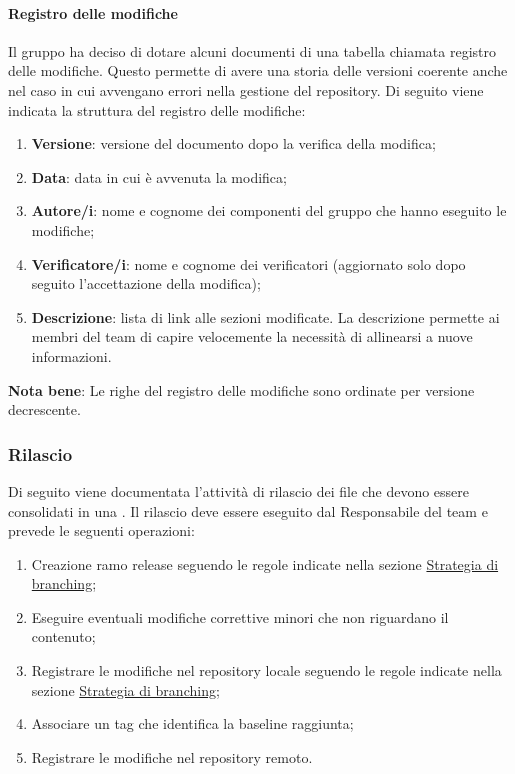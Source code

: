 \paragraph{Registro delle modifiche}
Il gruppo ha deciso di dotare alcuni documenti di una tabella chiamata registro delle modifiche.
Questo permette di avere una storia delle versioni coerente anche nel caso in cui avvengano errori nella gestione del repository.
Di seguito viene indicata la struttura del registro delle modifiche:
\begin{enumerate}
    \item \textbf{Versione}: versione del documento dopo la verifica della modifica;
    \item \textbf{Data}: data in cui è avvenuta la modifica;
    \item \textbf{Autore/i}: nome e cognome dei componenti del gruppo che hanno eseguito le modifiche;
    \item \textbf{Verificatore/i}: nome e cognome dei verificatori (aggiornato solo dopo seguito l'accettazione della modifica);
    \item \textbf{Descrizione}: lista di link alle sezioni modificate.
    La descrizione permette ai membri del team di capire velocemente la necessità di allinearsi a nuove informazioni. 
\end{enumerate} 
\textbf{Nota bene}: Le righe del registro delle modifiche sono ordinate per versione decrescente.

\subsubsection{Rilascio}
Di seguito viene documentata l'attività di rilascio dei file che devono essere consolidati in una .
Il rilascio deve essere eseguito dal Responsabile del team e prevede le seguenti operazioni:
\begin{enumerate}

    \item Creazione ramo release seguendo le regole indicate nella sezione \hyperref[subsub:branching]{Strategia di branching};
    
    \item Eseguire eventuali modifiche correttive minori che non riguardano il contenuto;

    \item Registrare le modifiche nel repository locale seguendo le regole indicate nella sezione  \hyperref[subsub:branching]{Strategia di branching};
    
    \item Associare un tag che identifica la baseline raggiunta;
    
    \item Registrare le modifiche nel repository remoto.
\end{enumerate}

